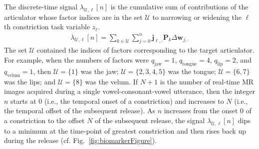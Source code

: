 \documentclass[reprint]{JASAnew}\usepackage[]{graphicx}\usepackage[]{color}
\begin{document}
The discrete-time signal $\lambda_{\mathcal{U},\ell}[n]$ is the cumulative sum of contributions of the articulator whose factor indices are in the set $\mathcal{U}$ to narrowing or widening the $\ell$th constriction task variable $z_\ell$. 
\begin{align}
\label{eq:lambda}
\lambda_{\mathcal{U},\ell} \left[ n \right]
	= \sum_{k\in \mathcal{U}} \sum_{j=0}^{n} \mathbf{j}_{\ell,\cdot} \mathbf{P}_k \Delta \mathbf{w}_{j,\cdot}
\end{align}
The set $\mathcal{U}$ contained the indices of factors corresponding to the target articulator. For example, when the numbers of factors were $q_\text{jaw} = 1$, $q_\text{tongue} = 4$, $q_\text{lip} = 2$, and $q_\text{velum} = 1$, then  $\mathcal{U}=\{1\}$ was the jaw; $\mathcal{U}=\{2,3,4,5\}$ was the tongue; $\mathcal{U}=\{6,7\}$ was the lips; and $\mathcal{U}=\{8\}$ was the velum.
%
If $N+1$ is the number of real-time MR images acquired during a single vowel-consonant-vowel utterance, then the integer $n$ starts at $0$ (i.e., the temporal onset of a constriction) and increases to $N$ (i.e., the temporal offset of the subsequent release). 
%
As $n$ increases from the onset $0$ of a constriction to the offset $N$ of the subsequent release, the signal $\lambda_{\mathcal{U},\ell}[n]$ dips to a minimum at the time-point of greatest constriction and then rises back up during the release (cf. Fig.~\ref{fig:biomarkerFigure}).
\end{document}
